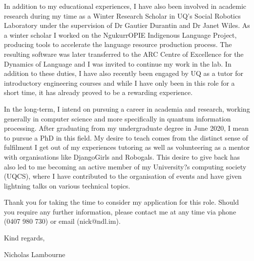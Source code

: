 \documentclass[a4paper]{article}
\begin{document}
\vspace{12pt}

In addition to my educational experiences, I have also been involved in academic research during my time as a Winter Research Scholar in UQ's Social Robotics Laboratory under the supervision of Dr Gautier Durantin and Dr Janet Wiles. As a winter scholar I worked on the NgukurrOPIE Indigenous Language Project, producing tools to accelerate the language resource production process. The resulting software was later transferred to the ARC Centre of Excellence for the Dynamics of Language and I was invited to continue my work in the lab. In addition to these duties, I have also recently been engaged by UQ as a tutor for introductory engineering courses and while I have only been in this role for a short time, it has already proved to be a rewarding experience.

\vspace{12pt}

In the long-term, I intend on pursuing a career in academia and research, working generally in computer science and more specifically in quantum information processing. After graduating from my undergraduate degree in June 2020, I mean to pursue a PhD in this field. My desire to teach comes from the distinct sense of fulfilment I get out of my experiences tutoring as well as volunteering as a mentor with organisations like DjangoGirls and Robogals. This desire to give back has also led to me becoming an active member of my University?s computing society (UQCS), where I have contributed to the organisation of events and have given lightning talks on various technical topics.

\vspace{12pt}

Thank you for taking the time to consider my application for this role. Should you require any further information, please contact me at any time via phone (0407 980 730) or email (nick@ndl.im).

\vspace{25pt}

Kind regards, \\

\vspace{12pt}

Nicholas Lambourne
\end{document}
